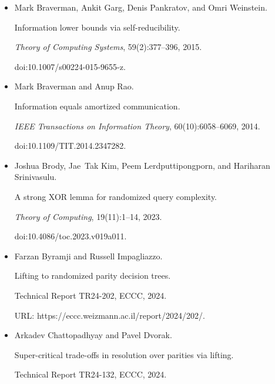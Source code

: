 \documentclass[10pt,a4paper]{article}
\begin{document}
\begin{itemize}
doi:10.4230/LIPIcs.CCC.2024.16.





\item[] 
[14]

Mark Braverman, Ankit Garg, Denis Pankratov, and Omri Weinstein.


Information lower bounds via self-reducibility.


\emph{Theory of Computing Systems}, 59(2):377–396, 2015.


doi:10.1007/s00224-015-9655-z.





\item[] 
[15]

Mark Braverman and Anup Rao.


Information equals amortized communication.


\emph{IEEE Transactions on Information Theory}, 60(10):6058–6069,
2014.


doi:10.1109/TIT.2014.2347282.





\item[] 
[16]

Joshua Brody, Jae Tak Kim, Peem Lerdputtipongporn, and Hariharan Srinivasulu.


A strong XOR lemma for randomized query complexity.


\emph{Theory of Computing}, 19(11):1–14, 2023.


doi:10.4086/toc.2023.v019a011.





\item[] 
[17]

Farzan Byramji and Russell Impagliazzo.


Lifting to randomized parity decision trees.


Technical Report TR24-202, ECCC, 2024.


URL: https://eccc.weizmann.ac.il/report/2024/202/.





\item[] 
[18]

Arkadev Chattopadhyay and Pavel Dvorak.


Super-critical trade-offs in resolution over parities via lifting.


Technical Report TR24-132, ECCC, 2024.



\end{itemize}
\end{document}
